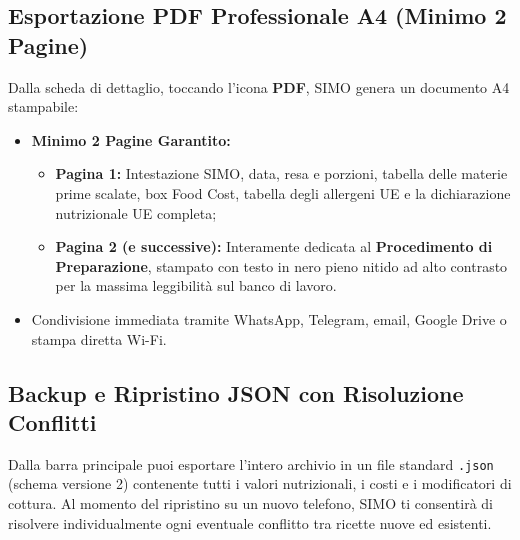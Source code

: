 \documentclass[11pt,a4paper]{article}
\begin{document}
\subsection{Esportazione PDF Professionale A4 (Minimo 2 Pagine)}
Dalla scheda di dettaglio, toccando l'icona \textbf{PDF}, SIMO genera un documento A4 stampabile:
\begin{itemize}[leftmargin=*]
    \item \textbf{Minimo 2 Pagine Garantito:}
    \begin{itemize}[noitemsep]
        \item \textbf{Pagina 1:} Intestazione SIMO, data, resa e porzioni, tabella delle materie prime scalate, box Food Cost, tabella degli allergeni UE e la dichiarazione nutrizionale UE completa;
        \item \textbf{Pagina 2 (e successive):} Interamente dedicata al \textbf{Procedimento di Preparazione}, stampato con testo in nero pieno nitido ad alto contrasto per la massima leggibilit\`a sul banco di lavoro.
    \end{itemize}
    \item Condivisione immediata tramite WhatsApp, Telegram, email, Google Drive o stampa diretta Wi-Fi.
\end{itemize}

\subsection{Backup e Ripristino JSON con Risoluzione Conflitti}
Dalla barra principale puoi esportare l'intero archivio in un file standard \texttt{.json} (schema versione 2) contenente tutti i valori nutrizionali, i costi e i modificatori di cottura. Al momento del ripristino su un nuovo telefono, SIMO ti consentir\`a di risolvere individualmente ogni eventuale conflitto tra ricette nuove ed esistenti.
\end{document}
